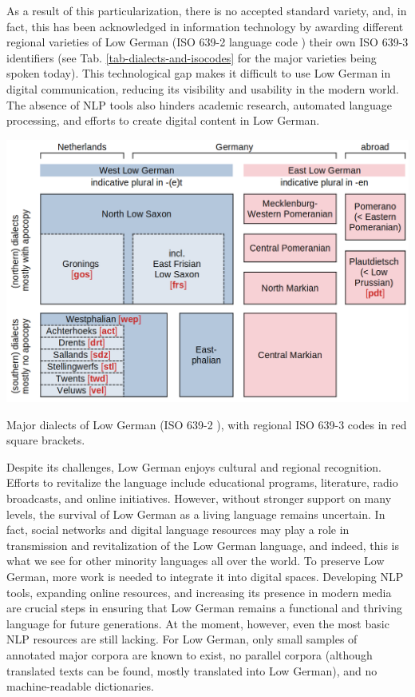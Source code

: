 \documentclass{article}
\begin{document}
As a result of this particularization, there is no accepted standard variety, and, in fact, this has been acknowledged in information technology by awarding different regional varieties of Low German (ISO 639-2 language code ) their own ISO 639-3 identifiers (see Tab. \ref{tab-dialects-and-isocodes} for the major varieties being spoken today). This technological gap makes it difficult to use Low German in digital communication, reducing its visibility and usability in the modern world. The absence of NLP tools also hinders academic research, automated language processing, and efforts to create digital content in Low German. 

\begin{table}
    \centering
    \includegraphics[width=0.8\linewidth]{dialects-and-iso632-codes.png}
    \caption{Major dialects of Low German (ISO 639-2 ), with regional ISO 639-3 codes in red square brackets.}
    \label{tab-dialects-and-isocodes}
\end{table}

Despite its challenges, Low German enjoys cultural and regional recognition. Efforts to revitalize the language include educational programs, literature, radio broadcasts, and online initiatives. However, without stronger support on many levels, the survival of Low German as a living language remains uncertain. In fact, social networks and digital language resources may play a role in transmission and revitalization of the Low German language, and indeed, this is what we see for other minority languages all over the world. 
To preserve Low German, more work is needed to integrate it into digital spaces. Developing NLP tools, expanding online resources, and increasing its presence in modern media are crucial steps in ensuring that Low German remains a functional and thriving language for future generations. At the moment, however, even the most basic NLP resources are still lacking. For Low German, only small samples of annotated major corpora are known to exist, no parallel corpora (although translated texts can be found, mostly translated into Low German), and no machine-readable dictionaries. 
\end{document}
